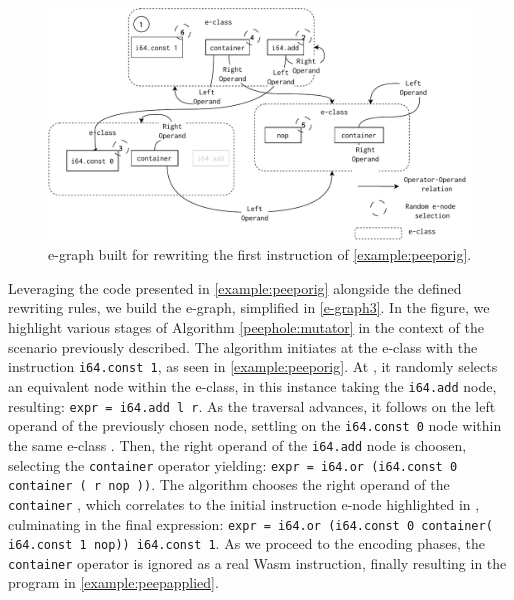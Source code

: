 


\begin{figure}
    \centering
    \includegraphics[width=1.0\linewidth]{figures/e-graph-traversal2.pdf}
    \caption{e-graph built for rewriting the first instruction of \autoref{example:peeporig}. }
  \label{e-graph3}
\end{figure}



Leveraging the code presented in \autoref{example:peeporig} alongside the defined rewriting rules, we build the e-graph, simplified in \autoref{e-graph3}.
In the figure, we highlight various stages of Algorithm \ref{peephole:mutator} in the context of the scenario previously described. 
The algorithm initiates at the e-class with the instruction \texttt{i64.const 1}, as seen in \autoref{example:peeporig}.
At , it randomly selects an equivalent node within the e-class, in this instance taking the \texttt{i64.add} node, resulting: {\texttt{expr = i64.add l r}}.
As the traversal advances, it follows on the left operand of the previously chosen node, settling on the \texttt{i64.const 0} node within the same e-class .
Then, the right operand of the \texttt{i64.add} node is choosen, selecting the \texttt{container}  operator yielding:
{\texttt{expr = i64.or (i64.const 0 container ( r nop ))}}.
The algorithm chooses the right operand of the \texttt{container} , which correlates to the initial instruction e-node highlighted in , culminating in the final expression:
{\texttt{expr = i64.or (i64.const 0 container( i64.const 1 nop))\ i64.const 1}}.
As we proceed to the encoding phases, the \texttt{container} operator is ignored as a real Wasm instruction, finally resulting in the program in \autoref{example:peepapplied}.

